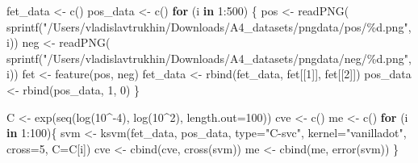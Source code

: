 \documentclass[
]{article}
\newenvironment{Shaded}{\begin{snugshade}}{\end{snugshade}}
\newcommand{\AttributeTok}[1]{\textcolor[rgb]{0.77,0.63,0.00}{#1}}
\newcommand{\ControlFlowTok}[1]{\textcolor[rgb]{0.13,0.29,0.53}{\textbf{#1}}}
\newcommand{\DecValTok}[1]{\textcolor[rgb]{0.00,0.00,0.81}{#1}}
\newcommand{\FunctionTok}[1]{\textcolor[rgb]{0.00,0.00,0.00}{#1}}
\newcommand{\NormalTok}[1]{#1}
\newcommand{\OtherTok}[1]{\textcolor[rgb]{0.56,0.35,0.01}{#1}}
\newcommand{\SpecialCharTok}[1]{\textcolor[rgb]{0.00,0.00,0.00}{#1}}
\newcommand{\StringTok}[1]{\textcolor[rgb]{0.31,0.60,0.02}{#1}}
\begin{document}
\begin{Shaded}
\begin{Highlighting}[]
\NormalTok{fet\_data }\OtherTok{\textless{}{-}} \FunctionTok{c}\NormalTok{()}
\NormalTok{pos\_data }\OtherTok{\textless{}{-}} \FunctionTok{c}\NormalTok{()}
\ControlFlowTok{for}\NormalTok{ (i }\ControlFlowTok{in} \DecValTok{1}\SpecialCharTok{:}\DecValTok{500}\NormalTok{) \{}
\NormalTok{  pos }\OtherTok{\textless{}{-}} \FunctionTok{readPNG}\NormalTok{(}
    \FunctionTok{sprintf}\NormalTok{(}\StringTok{"/Users/vladislavtrukhin/Downloads/A4\_datasets/pngdata/pos/\%d.png"}\NormalTok{, i))}
\NormalTok{  neg }\OtherTok{\textless{}{-}} \FunctionTok{readPNG}\NormalTok{(}
    \FunctionTok{sprintf}\NormalTok{(}\StringTok{"/Users/vladislavtrukhin/Downloads/A4\_datasets/pngdata/neg/\%d.png"}\NormalTok{, i))}
\NormalTok{  fet }\OtherTok{\textless{}{-}} \FunctionTok{feature}\NormalTok{(pos, neg)}
\NormalTok{  fet\_data }\OtherTok{\textless{}{-}} \FunctionTok{rbind}\NormalTok{(fet\_data, fet[[}\DecValTok{1}\NormalTok{]], fet[[}\DecValTok{2}\NormalTok{]])}
\NormalTok{  pos\_data }\OtherTok{\textless{}{-}} \FunctionTok{rbind}\NormalTok{(pos\_data, }\DecValTok{1}\NormalTok{, }\DecValTok{0}\NormalTok{)}
\NormalTok{\}}
\end{Highlighting}
\end{Shaded}

\begin{Shaded}
\begin{Highlighting}[]
\NormalTok{C }\OtherTok{\textless{}{-}} \FunctionTok{exp}\NormalTok{(}\FunctionTok{seq}\NormalTok{(}\FunctionTok{log}\NormalTok{(}\DecValTok{10}\SpecialCharTok{\^{}{-}}\DecValTok{4}\NormalTok{), }\FunctionTok{log}\NormalTok{(}\DecValTok{10}\SpecialCharTok{\^{}}\DecValTok{2}\NormalTok{), }\AttributeTok{length.out=}\DecValTok{100}\NormalTok{))}
\NormalTok{cve }\OtherTok{\textless{}{-}} \FunctionTok{c}\NormalTok{()}
\NormalTok{me }\OtherTok{\textless{}{-}} \FunctionTok{c}\NormalTok{()}
\ControlFlowTok{for}\NormalTok{ (i }\ControlFlowTok{in} \DecValTok{1}\SpecialCharTok{:}\DecValTok{100}\NormalTok{)\{}
\NormalTok{  svm }\OtherTok{\textless{}{-}} \FunctionTok{ksvm}\NormalTok{(fet\_data, pos\_data, }\AttributeTok{type=}\StringTok{"C{-}svc"}\NormalTok{, }\AttributeTok{kernel=}\StringTok{"vanilladot"}\NormalTok{, }\AttributeTok{cross=}\DecValTok{5}\NormalTok{, }\AttributeTok{C=}\NormalTok{C[i])}
\NormalTok{  cve }\OtherTok{\textless{}{-}} \FunctionTok{cbind}\NormalTok{(cve, }\FunctionTok{cross}\NormalTok{(svm))}
\NormalTok{  me }\OtherTok{\textless{}{-}} \FunctionTok{cbind}\NormalTok{(me, }\FunctionTok{error}\NormalTok{(svm))}
\NormalTok{\}}
\end{Highlighting}
\end{Shaded}
\end{document}
